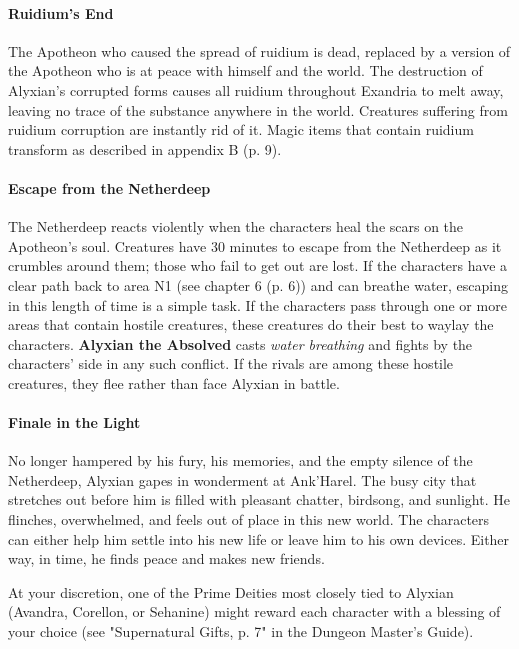\documentclass[letterpaper, 11pt, bg=full, twocolumn]{dndbook}
\begin{document}
\paragraph{Ruidium's End}

The Apotheon who caused the spread of ruidium is dead, replaced by a version of the Apotheon who is at peace with himself and the world. The destruction of Alyxian's corrupted forms causes all ruidium throughout Exandria to melt away, leaving no trace of the substance anywhere in the world. Creatures suffering from ruidium corruption are instantly rid of it. Magic items that contain ruidium transform as described in appendix B (p. 9).

\paragraph{Escape from the Netherdeep}

The Netherdeep reacts violently when the characters heal the scars on the Apotheon's soul. Creatures have 30 minutes to escape from the Netherdeep as it crumbles around them; those who fail to get out are lost. If the characters have a clear path back to area N1 (see chapter 6 (p. 6)) and can breathe water, escaping in this length of time is a simple task. If the characters pass through one or more areas that contain hostile creatures, these creatures do their best to waylay the characters. \textbf{Alyxian the Absolved} casts \textit{water breathing} and fights by the characters' side in any such conflict. If the rivals are among these hostile creatures, they flee rather than face Alyxian in battle.

\paragraph{Finale in the Light}

No longer hampered by his fury, his memories, and the empty silence of the Netherdeep, Alyxian gapes in wonderment at Ank'Harel. The busy city that stretches out before him is filled with pleasant chatter, birdsong, and sunlight. He flinches, overwhelmed, and feels out of place in this new world. The characters can either help him settle into his new life or leave him to his own devices. Either way, in time, he finds peace and makes new friends.

At your discretion, one of the Prime Deities most closely tied to Alyxian (Avandra, Corellon, or Sehanine) might reward each character with a blessing of your choice (see "Supernatural Gifts, p. 7" in the Dungeon Master's Guide).
\end{document}

